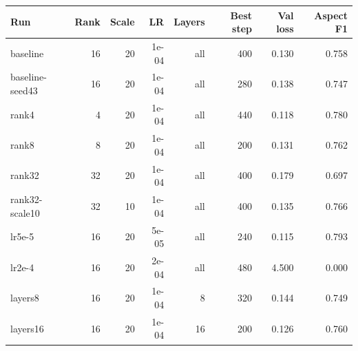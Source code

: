 \begin{tabular}{lrrrrrrr}
\toprule
Run & Rank & Scale & LR & Layers & Best step & Val loss & Aspect F1 \\
\midrule
baseline & 16 & 20 & 1e-04 & all & 400 & 0.130 & 0.758 \\
baseline-seed43 & 16 & 20 & 1e-04 & all & 280 & 0.138 & 0.747 \\
rank4 & 4 & 20 & 1e-04 & all & 440 & 0.118 & 0.780 \\
rank8 & 8 & 20 & 1e-04 & all & 200 & 0.131 & 0.762 \\
rank32 & 32 & 20 & 1e-04 & all & 400 & 0.179 & 0.697 \\
rank32-scale10 & 32 & 10 & 1e-04 & all & 400 & 0.135 & 0.766 \\
lr5e-5 & 16 & 20 & 5e-05 & all & 240 & 0.115 & 0.793 \\
lr2e-4 & 16 & 20 & 2e-04 & all & 480 & 4.500 & 0.000 \\
layers8 & 16 & 20 & 1e-04 & 8 & 320 & 0.144 & 0.749 \\
layers16 & 16 & 20 & 1e-04 & 16 & 200 & 0.126 & 0.760 \\
\bottomrule
\end{tabular}
